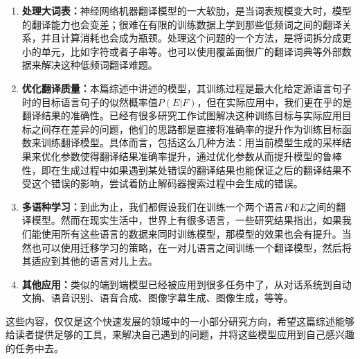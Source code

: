 \documentclass[10pt,a4paper]{ctexart}
\begin{document}
\begin{enumerate}
\item[] \textbf{处理大词表：}神经网络机器翻译模型的一大软肋，是当词表规模变大时，模型的翻译能力也会变差；很难在有限的训练数据上学到那些低频词之间的翻译关系，并且计算消耗也会成为瓶颈。处理这个问题的一个方法，是将词拆分成更小的单元，比如字符\cite{chung2016character}或者子串\cite{sennrich2015neural}等。也可以使用覆盖面很广的翻译词典等外部数据来解决这种低频词翻译难题\cite{arthur2016incorporating}。
\item[] \textbf{优化翻译质量：}本篇综述中讲述的模型，其训练过程是最大化给定源语言句子时的目标语言句子的似然概率值$P(E|F)$，但在实际应用中，我们更在乎的是翻译结果的准确性。已经有很多研究工作试图解决这种训练目标与实际应用目标之间存在差异的问题，他们的思路都是直接将准确率的提升作为训练目标函数来训练翻译模型。具体而言，包括这么几种方法：用当前模型生成的采样结果来优化参数使得翻译结果准确率提升\cite{ranzato2015sequence,shen2015minimum}，通过优化参数从而提升模型的鲁棒性，即在生成过程中如果遇到某处错误的翻译结果也能保证之后的翻译结果不受这个错误的影响\cite{NIPS2015_5956,norouzi2016reward}，尝试着防止解码器搜索过程中会生成的错误\cite{wiseman2016sequence}。
\item[] \textbf{多语种学习：}到此为止，我们都假设我们在训练一个两个语言$F$和$E$之间的翻译模型。然而在现实生活中，世界上有很多语言，一些研究结果指出，如果我们能使用所有这些语言的数据来同时训练模型，那模型的效果也会有提升\cite{firat2016multi,johnson2016google,ha2016toward}。当然也可以使用迁移学习的策略，在一对儿语言之间训练一个翻译模型，然后将其适应到其他的语言对儿上去\cite{zoph2016transfer}。
\item[] \textbf{其他应用：}类似的端到端模型已经被应用到很多任务中了，从对话系统\cite{vinyals2015neural,shang2015neural}到自动文摘\cite{rush2015neural}、语音识别\cite{chan2016listen}、语音合成\cite{van2016wavenet}、图像字幕生成\cite{karpathy2015deep,vinyals2015show}、图像生成\cite{gregor2015draw}，等等。
\end{enumerate}

这些内容，仅仅是这个快速发展的领域中的一小部分研究方向，希望这篇综述能够给读者提供足够的工具，来解决自己遇到的问题，并将这些模型应用到自己感兴趣的任务中去。

\newpage

\begin{appendix}


\end{appendix}
\end{document}
